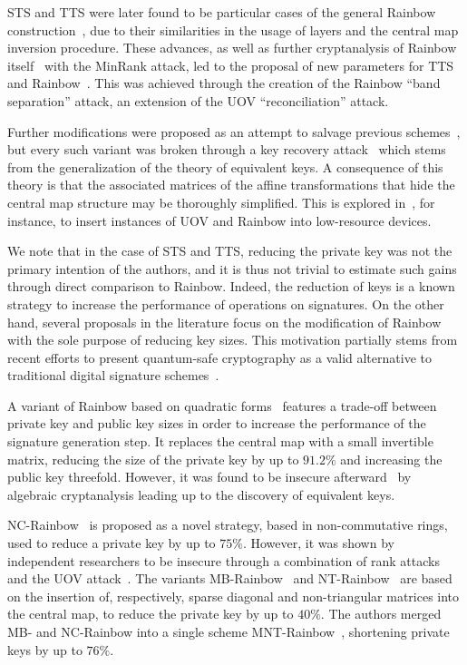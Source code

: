 \documentclass[12pt, a4paper, oneside]{memoir}
\theoremstyle{definition}
\begin{document}
STS and TTS were later found to be particular cases of the general Rainbow construction~\cite{Ding:200806}, due to their similarities in the usage of layers and the central map inversion procedure. These advances, as well as further cryptanalysis of Rainbow itself~\cite{Billet:200609} with the MinRank attack, led to the proposal of new parameters for TTS and Rainbow~\cite{Ding:200806}. This was achieved through the creation of the Rainbow ``band separation''  attack, an extension of the UOV ``reconciliation'' attack. 

Further modifications were proposed as an attempt to salvage previous schemes~\cite{Tsujii:201005}, but every such variant was broken through a key recovery attack~\cite{Thomae:201207} which stems from the generalization of the theory of equivalent keys. A consequence of this theory is that the associated matrices of the affine transformations that hide the central map structure may be thoroughly simplified. This is explored in~\cite{Czypek:201209}, for instance, to insert instances of UOV and Rainbow into low-resource devices.

We note that in the case of STS and TTS, reducing the private key was not the primary intention of the authors, and it is thus not trivial to estimate such gains through direct comparison to Rainbow. Indeed, the reduction of keys is a known strategy to increase the performance of operations on signatures. On the other hand, several proposals in the literature focus on the modification of Rainbow with the sole purpose of reducing key sizes. This motivation partially stems from recent efforts to present quantum-safe cryptography as a valid alternative to traditional digital signature schemes~\cite{Bernstein:2008}.

A variant of Rainbow based on quadratic forms~\cite{Yasuda:201306} features a trade-off between private key and public key sizes in order to increase the performance of the signature generation step. It replaces the central map with a small invertible matrix, reducing the size of the private key by up to $91.2\%$ and increasing the public key threefold. However, it was found to be insecure afterward~\cite{Hashimoto:201601} by algebraic cryptanalysis leading up to the discovery of equivalent keys.

NC-Rainbow~\cite{Yasuda:201202} is proposed as a novel strategy, based in non-commutative rings, used to reduce a private key by up to $75\%$. However, it was shown by independent researchers to be insecure through a combination of rank attacks and the UOV attack~\cite{Thomae:201209,Hashimoto:201501}. The variants MB-Rainbow~\cite{Yasuda:201305} and NT-Rainbow~\cite{Yasuda:201404} are based on the insertion of, respectively, sparse diagonal and non-triangular matrices into the central map, to reduce the private key by up to $40\%$. The authors merged MB- and NC-Rainbow into a single scheme MNT-Rainbow~\cite{Yasuda:201409}, shortening private keys by up to $76\%$. 
\end{document}
